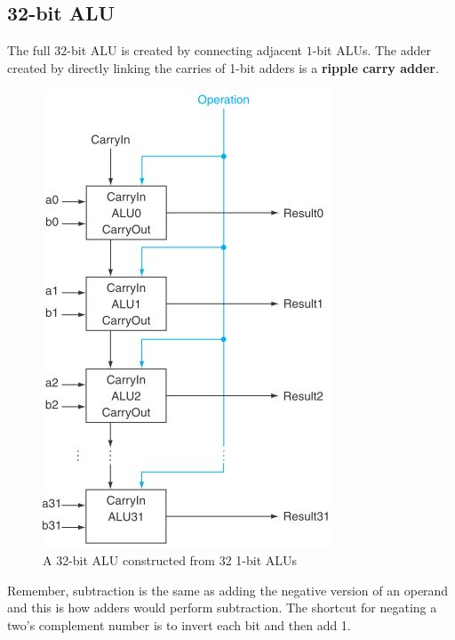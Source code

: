 \documentclass[10pt,a4paper]{article}
\begin{document}
\pagebreak

\subsection{32-bit ALU}

The full $32$-bit ALU is created by connecting adjacent $1$-bit ALUs. The adder created by directly
linking the carries of 1-bit adders is a \textbf{ripple carry adder}.
\begin{figure} [h!]
    \centering
    \includegraphics[scale=0.7]{32 ALU.JPG}
    \caption{A 32-bit ALU constructed from 32 1-bit ALUs}
\end{figure}

Remember, subtraction is the same as adding the negative version of an operand and this is how
adders would perform subtraction. The shortcut for negating a two’s complement number is to invert
each bit and then add 1. 
\end{document}

